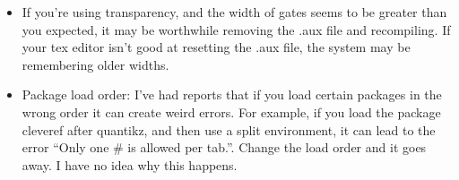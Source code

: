 \documentclass[aps,pra,10pt,nofootinbib]{revtex4-2}
\begin{document}
\begin{itemize}
\item If you're using transparency, and the width of gates seems to be greater than you expected, it may be worthwhile removing the .aux file and recompiling. If your tex editor isn't good at resetting the .aux file, the system may be remembering older widths.
\item Package load order: I've had reports that if you load certain packages in the wrong order it can create weird errors. For example, if you load the package cleveref after quantikz, and then use a split environment, it can lead to the error ``Only one \# is allowed per tab.''. Change the load order and it goes away. I have no idea why this happens.

\end{itemize}
\end{document}
